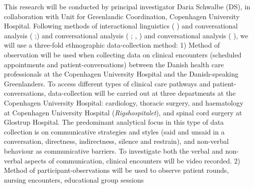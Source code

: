 \documentclass[twocolumn, serif, rga, authordate]{jote-article}
\begin{document}
This research will be conducted by principal investigator Daria Schwalbe
(DS), in collaboration with Unit for Greenlandic Coordination, Copenhagen University Hospital. Following methods of interactional linguistics ( \citeyear{Gumperz1972}) and conversational analysis ( \citeyear{Schegloff1990};\citeyear{Gumperz1972}) and conversational analysis ( \citeyear{Schegloff1991}; , \citeyear{Gumperz1972}) and conversational analysis ( \citeyear{Schegloff1991}), we will use a three-fold ethnographic data-collection method: 1)
Method of observation will be used when collecting data on clinical encounters (scheduled appointments and patient-conversations) between the Danish health care professionals at the Copenhagen University Hospital and the Danish-speaking Greenlanders. To access different types of clinical care pathways and patient-conversations, data-collection will be carried out at three departments at the Copenhagen University Hospital: cardiology, thoracic surgery, and haematology at Copenhagen University Hospital (\emph{Rigshospitalet}), and spinal cord surgery at Glostrup Hospital. The predominant analytical focus in this type of data collection is on communicative strategies and styles (said and unsaid in a conversation, directness, indirectness, silence and restrain), and non-verbal behaviour as communicative barriers. To investigate both the verbal and non-verbal aspects of communication, clinical encounters will be video recorded. 2) Method of participant-observations will be used to observe patient rounds, nursing encounters, educational group sessions
\end{document}
